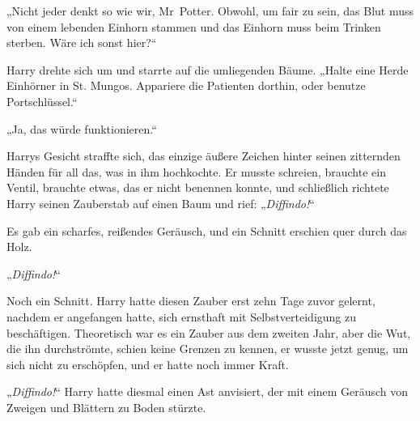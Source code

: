 „Nicht jeder denkt so wie wir, Mr~Potter. Obwohl, um fair zu sein, das Blut muss von einem lebenden Einhorn stammen und das Einhorn muss beim Trinken sterben. Wäre ich sonst hier?“

Harry drehte sich um und starrte auf die umliegenden Bäume. „Halte eine Herde Einhörner in St. Mungos. Appariere die Patienten dorthin, oder benutze Portschlüssel.“

„Ja, das würde funktionieren.“

Harrys Gesicht straffte sich, das einzige äußere Zeichen hinter seinen zitternden Händen für all das, was in ihm hochkochte. Er musste schreien, brauchte ein Ventil, brauchte etwas, das er nicht benennen konnte, und schließlich richtete Harry seinen Zauberstab auf einen Baum und rief: „\emph{Diffindo!}“

Es gab ein scharfes, reißendes Geräusch, und ein Schnitt erschien quer durch das Holz.

„\emph{Diffindo!}“

Noch ein Schnitt. Harry hatte diesen Zauber erst zehn Tage zuvor gelernt, nachdem er angefangen hatte, sich ernsthaft mit Selbstverteidigung zu beschäftigen. Theoretisch war es ein Zauber aus dem zweiten Jahr, aber die Wut, die ihn durchströmte, schien keine Grenzen zu kennen, er wusste jetzt genug, um sich nicht zu erschöpfen, und er hatte noch immer Kraft.

„\emph{Diffindo!}“ Harry hatte diesmal einen Ast anvisiert, der mit einem Geräusch von Zweigen und Blättern zu Boden stürzte.

